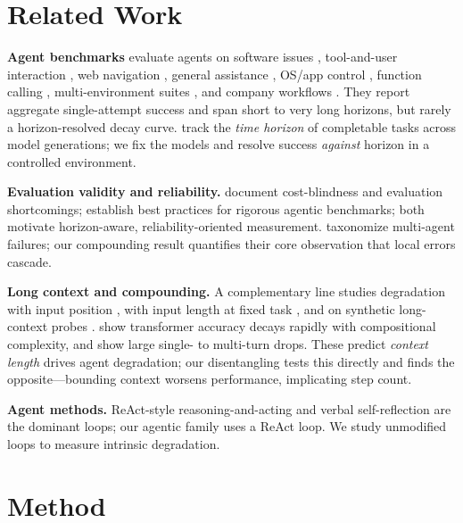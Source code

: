 \documentclass[11pt]{article}
\begin{document}
\section{Related Work}
\textbf{Agent benchmarks} evaluate agents on software issues
\citep{jimenez2024swebench}, tool-and-user interaction
\citep{yao2024taubench,barres2025tau2bench}, web navigation
\citep{zhou2023webarena,deng2023mind2web}, general assistance \citep{mialon2023gaia},
OS/app control \citep{xie2024osworld,trivedi2024appworld}, function calling
\citep{patil2025bfcl}, multi-environment suites \citep{liu2024agentbench}, and company
workflows \citep{xu2024agentcompany}. They report aggregate single-attempt success and
span short to very long horizons, but rarely a horizon-resolved decay curve.
\citet{kwa2025metr} track the \emph{time horizon} of completable tasks across model
generations; we fix the models and resolve success \emph{against} horizon in a
controlled environment.

\textbf{Evaluation validity and reliability.} \citet{kapoor2024agents} document
cost-blindness and evaluation shortcomings; \citet{zhu2025abc} establish best practices
for rigorous agentic benchmarks; both motivate horizon-aware, reliability-oriented
measurement. \citet{cemri2025mast} taxonomize multi-agent failures; our compounding
result quantifies their core observation that local errors cascade.

\textbf{Long context and compounding.} A complementary line studies degradation with
input position \citep{liu2024lostmiddle}, with input length at fixed task
\citep{levy2024moretokens}, and on synthetic long-context probes
\citep{hsieh2024ruler,modarressi2025nolima}. \citet{dziri2023faithfate} show
transformer accuracy decays rapidly with compositional complexity, and
\citet{laban2025lostconv} show large single- to multi-turn drops. These predict
\emph{context length} drives agent degradation; our disentangling tests this directly
and finds the opposite---bounding context worsens performance, implicating step count.

\textbf{Agent methods.} ReAct-style reasoning-and-acting \citep{yao2023react} and
verbal self-reflection \citep{shinn2023reflexion} are the dominant loops; our agentic
family uses a ReAct loop. We study unmodified loops to measure intrinsic degradation.

\section{Method}\label{sec:method}
\end{document}
